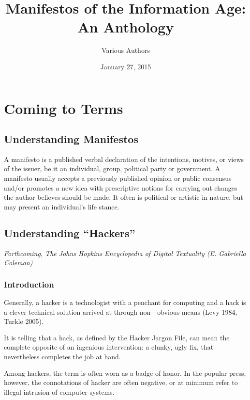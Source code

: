 \documentclass[letterpaper,12pt,english]{sphinxmanual}
\title{Manifestos of the Information Age: An Anthology}
\date{January 27, 2015}
\author{Various Authors}
\begin{document}
\maketitle
\tableofcontents
{}\label{index::doc}



\chapter{Coming to Terms}
\label{preface:coming-to-terms}\label{preface::doc}\label{preface:manifestos-for-the-information-age-an-anthology}

\section{Understanding Manifestos}
\label{preface:understanding-manifestos}
A manifesto is a published verbal declaration of the intentions, motives, or views of the issuer, be it an individual, group, political party or government. A manifesto usually accepts a previously published opinion or public consensus and/or promotes a new idea with prescriptive notions for carrying out changes the author believes should be made. It often is political or artistic in nature, but may present an individual's life stance.


\section{Understanding ``Hackers''}
\label{preface:understanding-hackers}
\emph{Forthcoming, The Johns Hopkins Encyclopedia of Digital Textuality (E. Gabriella Coleman)}


\subsection{Introduction}
\label{preface:introduction}
Generally,
a
hacker
is
a
technologist
with
a
penchant
for
computing
and
a
hack
is
a
clever
technical
solution
arrived
at
through
non
-
obvious
means (Levy
1984,
Turkle
2005).

It
is
telling
that
a
hack,
as
defined
by
the
Hacker
Jargon
File, can mean the complete opposite of an ingenious intervention: a clunky, ugly fix,
that nevertheless completes the job at hand.

Among hackers, the term is often worn as a badge of honor. In the popular press, however, the
connotations
of
hacker
are
often
negative,
or
at
minimum
refer
to
illegal
intrusion
of
computer
systems.
\end{document}
